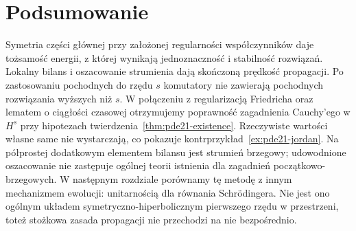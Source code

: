\section{Podsumowanie}
Symetria części głównej przy założonej regularności
współczynników daje tożsamość energii, z której
wynikają jednoznaczność i stabilność rozwiązań.
Lokalny bilans i oszacowanie strumienia dają
skończoną prędkość propagacji. Po zastosowaniu
pochodnych do rzędu $s$ komutatory nie zawierają
pochodnych rozwiązania wyższych niż $s$.
W połączeniu z regularizacją Friedricha oraz
lematem o ciągłości czasowej otrzymujemy
poprawność zagadnienia Cauchy'ego w $H^s$
przy hipotezach twierdzenia~\ref{thm:pde21-existence}.
Rzeczywiste wartości własne same nie wystarczają,
co pokazuje kontrprzykład~\ref{ex:pde21-jordan}.
Na półprostej dodatkowym elementem bilansu jest
strumień brzegowy; udowodnione oszacowanie nie
zastępuje ogólnej teorii istnienia dla zagadnień
początkowo-brzegowych.
W następnym rozdziale porównamy tę metodę z innym
mechanizmem ewolucji: unitarnością dla równania Schrödingera.
Nie jest ono ogólnym układem symetryczno-hiperbolicznym
pierwszego rzędu w przestrzeni, toteż stożkowa zasada
propagacji nie przechodzi na nie bezpośrednio.

